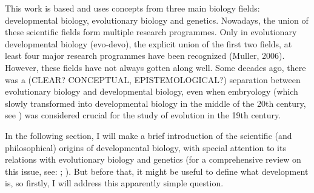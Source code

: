 This work is based and uses concepts from three main biology fields: 
developmental biology, evolutionary biology and genetics.
Nowadays, the union of these scientific fields form multiple research programmes. 
Only in evolutionary developmental biology (evo-devo), the explicit union of the first two fields, at least four major research programmes have been recognized (Muller, 2006).
However, these fields have not always gotten along well. 
Some decades ago, there was a (CLEAR? CONCEPTUAL, EPISTEMOLOGICAL?) separation between evolutionary biology and developmental biology, even when embryology (which slowly transformed into developmental biology in the middle of the 20th century, see \citealp{Horder2010}) was considered crucial for the study of evolution in the 19th century.

In the following section, I will make a brief introduction of the scientific (and philosophical) origins of developmental biology, with special attention to its relations with evolutionary biology and genetics (for a comprehensive review on this issue, see: \citealp{amundson2005changing}; \citealp{gilbert1991conceptual}).
But before that, it might be useful to define what development is, so firstly, I will address this apparently simple question.